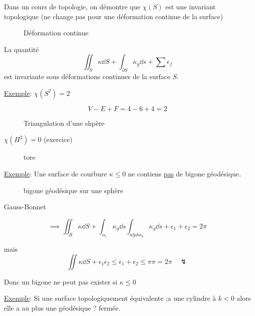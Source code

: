Dans un cours de topologie, on démontre que $\chi(S)$ est une invariant topologique (ne change pas pour une déformation continue de la surface)

\begin{figure}[ht]
    \centering
    \caption{Déformation continue}
    \label{fig:déformation-continue}
\end{figure}

La quantité $$\iint_S \kappa \dd S + \int_{\partial S} \kappa_g \dd s + \sum \epsilon_f $$ est invariante sous déformations continues de la surface $S$.


\underline{Exemple}: $\chi(S^2) = 2$

$$V-E+F =4-6+4 =2$$

\begin{figure}[ht]
    \centering
    \caption{Triangulation d'une shpère}
    \label{fig:triangulation-d'une-shpère}
\end{figure}


$\chi(\Pi^2) = 0$ (exercice)

\begin{figure}[ht]
    \centering
    \caption{tore}
    \label{fig:tore}
\end{figure}


\underline{Exemple}: Une surface de courbure $\kappa \leq 0$ ne contiens \underline{pas} de bigone géodésique.

\begin{figure}[ht]
    \centering
    \caption{bigone géodésique sur une sphère}
    \label{fig:bigone-géodésique-sur-une-sphère}
\end{figure}

Gauss-Bonnet

$$\implies \iint_R \kappa \dd S + \int_{\alpha_1} \kappa_g \dd s\int_{alpha_{2}}  \kappa_g \dd s + \epsilon_1 + \epsilon_2 = 2\pi$$

mais $$\iint \kappa \dd S + \epsilon_1 \epsilon_2 \leq \epsilon_1 + \epsilon_2 \leq \pi \pi = 2\pi \quad \lightning$$ 

Donc un bigone ne peut pas exister si $\kappa \leq 0$ 

\underline{Exemple}: Si une surface topologiquement équivalente ;a une cylindre à $k < 0$ alors elle a au plus une géodésique ? fermée.  


